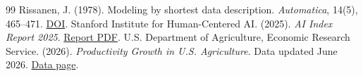 \documentclass[11pt]{article}
\begin{document}
\begin{thebibliography}{99}
 Rissanen, J. (1978). Modeling by shortest data description. \emph{Automatica}, 14(5), 465--471. \href{https://doi.org/10.1016/0005-1098(78)90005-5}{DOI}.
 Stanford Institute for Human-Centered AI. (2025). \emph{AI Index Report 2025}. \href{https://hai.stanford.edu/assets/files/hai_ai_index_report_2025.pdf}{Report PDF}.
 U.S. Department of Agriculture, Economic Research Service. (2026). \emph{Productivity Growth in U.S. Agriculture}. Data updated June 2026. \href{https://www.ers.usda.gov/data-products/agricultural-productivity-in-the-united-states/productivity-growth-in-us-agriculture}{Data page}.
\fussy
\end{thebibliography}
\end{document}
